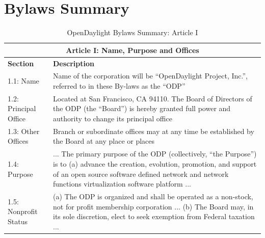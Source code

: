 \documentclass[a4paper, 12pt]{book}
\begin{document}
\chapter{Bylaws Summary}
\label{chap:appendix_bylaws}
\begin{table}[H]
  \begin{center}
    \begin{tabular}{ | p{4cm} | p{11cm} | }
    \toprule
    \multicolumn {2}{|c|}{\textbf{Article I: Name, Purpose and Offices}} \\
    \hline
    \textbf{Section} & \textbf{Description} \\
    \hline
    1.1: Name & Name of the corporation will be “OpenDaylight Project, Inc.”, referred to in these By-laws as the “ODP” \\
    \hline
    1.2: Principal Office & Located at San Francisco, CA 94110.  The Board of Directors of the ODP (the “Board”) is hereby granted full power and authority to change its principal office \\
    \hline
    1.3: Other Offices & Branch or subordinate offices may at any time be established by the Board at any place or places \\
    \hline
    1.4: Purpose & ... The primary purpose of the ODP (collectively, “the Purpose”) is to (a) advance the creation, evolution, promotion, and support of an open source software defined network and network functions virtualization software platform ... \\
    \hline
    1.5: Nonprofit Status & (a) The ODP is organized and shall be operated as a non-stock, not for profit membership corporation ... (b) The Board may, in its sole discretion, elect to seek exemption from Federal taxation ...\\
    \bottomrule
    \end{tabular}
    \caption{OpenDaylight Bylaws Summary: Article I}
    \label{tab:odlbylaws-art01}
  \end{center}
\end{table}
\end{document}
